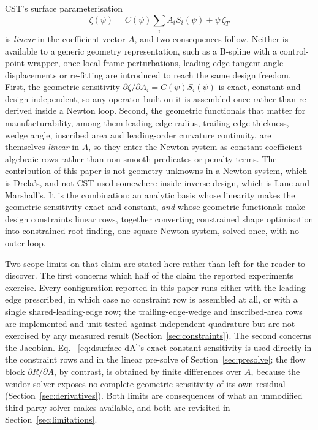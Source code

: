 CST's surface parameterisation
\begin{equation}
  \zeta(\psi) = C(\psi)\sum_i A_i S_i(\psi) + \psi\,\zeta_T
  \label{eq:cst-intro}
\end{equation}
is \emph{linear} in the coefficient vector $A$, and two consequences follow.
Neither is available to a generic geometry representation, such as a B-spline
with a control-point wrapper, once local-frame perturbations, leading-edge
tangent-angle displacements or re-fitting are introduced to reach the same
design freedom. First, the geometric sensitivity
$\partial\zeta/\partial A_i = C(\psi)S_i(\psi)$ is exact, constant and
design-independent, so any operator built on it is assembled once rather than
re-derived inside a Newton loop. Second, the geometric functionals that matter
for manufacturability, among them leading-edge radius, trailing-edge
thickness, wedge angle, inscribed area and leading-order curvature continuity,
are themselves \emph{linear} in $A$, so they enter the Newton system as
constant-coefficient algebraic rows rather than non-smooth predicates or
penalty terms. The contribution of this paper is not geometry unknowns in a
Newton system, which is Drela's, and not CST used somewhere inside inverse
design, which is Lane and Marshall's. It is the combination: an analytic basis
whose linearity makes the geometric sensitivity exact and constant,
\emph{and} whose geometric functionals make design constraints linear rows,
together converting constrained shape optimisation into constrained
root-finding, one square Newton system, solved once, with no outer loop.

Two scope limits on that claim are stated here rather than left for the
reader to discover. The first concerns which half of the claim the reported
experiments exercise. Every configuration reported in this paper runs either
with the leading edge prescribed, in which case no constraint row is assembled
at all, or with a single shared-leading-edge row; the trailing-edge-wedge and
inscribed-area rows are implemented and unit-tested against independent
quadrature but are not exercised by any measured result
(Section~\ref{sec:constraints}). The second concerns the Jacobian. Eq.~
\eqref{eq:dsurface-dA}'s exact constant sensitivity is used directly in the
constraint rows and in the linear pre-solve of Section~\ref{sec:presolve}; the
flow block $\partial R/\partial A$, by contrast, is obtained by finite
differences over $A$, because the vendor solver exposes no complete geometric
sensitivity of its own residual (Section~\ref{sec:derivatives}). Both limits
are consequences of what an unmodified third-party solver makes available, and
both are revisited in Section~\ref{sec:limitations}.

